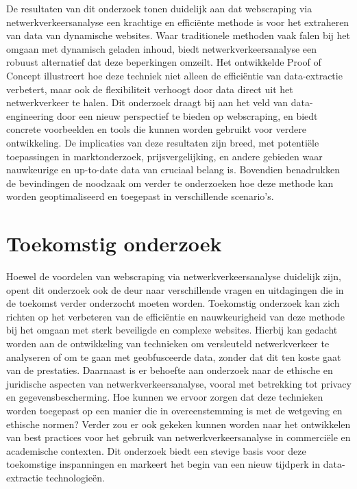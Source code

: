 \documentclass[a0,portrait]{hogent-poster}
\begin{document}
\begin{multicols}{2}
De resultaten van dit onderzoek tonen duidelijk aan dat webscraping via netwerkverkeersanalyse een krachtige en efficiënte methode is voor het extraheren van data van dynamische websites. Waar traditionele methoden vaak falen bij het omgaan met dynamisch geladen inhoud, biedt netwerkverkeersanalyse een robuust alternatief dat deze beperkingen omzeilt. Het ontwikkelde Proof of Concept illustreert hoe deze techniek niet alleen de efficiëntie van data-extractie verbetert, maar ook de flexibiliteit verhoogt door data direct uit het netwerkverkeer te halen. Dit onderzoek draagt bij aan het veld van data-engineering door een nieuw perspectief te bieden op webscraping, en biedt concrete voorbeelden en tools die kunnen worden gebruikt voor verdere ontwikkeling. De implicaties van deze resultaten zijn breed, met potentiële toepassingen in marktonderzoek, prijsvergelijking, en andere gebieden waar nauwkeurige en up-to-date data van cruciaal belang is. Bovendien benadrukken de bevindingen de noodzaak om verder te onderzoeken hoe deze methode kan worden geoptimaliseerd en toegepast in verschillende scenario's.

\section{Toekomstig onderzoek}

Hoewel de voordelen van webscraping via netwerkverkeersanalyse duidelijk zijn, opent dit onderzoek ook de deur naar verschillende vragen en uitdagingen die in de toekomst verder onderzocht moeten worden. Toekomstig onderzoek kan zich richten op het verbeteren van de efficiëntie en nauwkeurigheid van deze methode bij het omgaan met sterk beveiligde en complexe websites. Hierbij kan gedacht worden aan de ontwikkeling van technieken om versleuteld netwerkverkeer te analyseren of om te gaan met geobfusceerde data, zonder dat dit ten koste gaat van de prestaties. Daarnaast is er behoefte aan onderzoek naar de ethische en juridische aspecten van netwerkverkeersanalyse, vooral met betrekking tot privacy en gegevensbescherming. Hoe kunnen we ervoor zorgen dat deze technieken worden toegepast op een manier die in overeenstemming is met de wetgeving en ethische normen? Verder zou er ook gekeken kunnen worden naar het ontwikkelen van best practices voor het gebruik van netwerkverkeersanalyse in commerciële en academische contexten. Dit onderzoek biedt een stevige basis voor deze toekomstige inspanningen en markeert het begin van een nieuw tijdperk in data-extractie technologieën.

\end{multicols}
\end{document}
